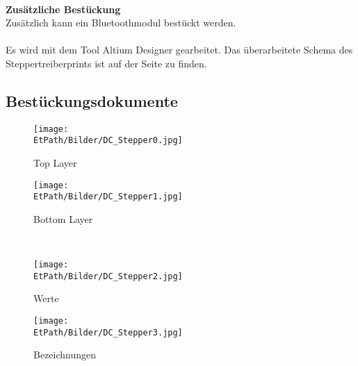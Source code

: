     \\
    \textbf{Zusätzliche Bestückung}\\
    Zusätzlich kann ein Bluetoothmodul bestückt werden. \\\\
    Es wird mit dem Tool Altium Designer gearbeitet. Das überarbeitete Schema 
    des Steppertreiberprints ist auf der Seite \pageref{Schema} zu finden. 
    
    \newpage
    \subsection*{Bestückungsdokumente}
    \begin{figure}[h!]
        \centering
        \begin{minipage}[hbt]{6cm}
            \centering
            \texttt{[image: \\EtPath/Bilder/DC\_Stepper0.jpg]}
            \caption{Top Layer}
            \label{fig:Top Layer}
        \end{minipage}
        \hspace{1.5cm}
        \begin{minipage}[hbt]{6cm}
            \centering
            \texttt{[image: \\EtPath/Bilder/DC\_Stepper1.jpg]}
            \caption{Bottom Layer}
            \label{fig:Bottom Layer}
        \end{minipage}
        \\[4ex]
        \begin{minipage}[hbt]{6cm}
            \centering
            \texttt{[image: \\EtPath/Bilder/DC\_Stepper2.jpg]}
            \caption{Werte}
            \label{fig:Werte}
        \end{minipage}
        \hspace{1.5cm}
        \begin{minipage}[hbt]{6cm}
            \centering
            \texttt{[image: \\EtPath/Bilder/DC\_Stepper3.jpg]}
            \caption{Bezeichnungen}
            \label{fig:Bezeichnungen}
        \end{minipage}
    \end{figure}
    \ifSTANDALONE
